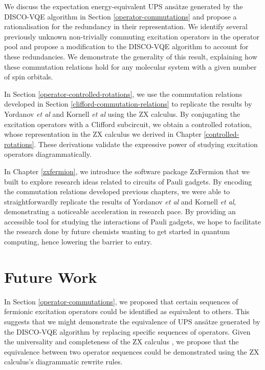 We discuss the expectation energy-equivalent UPS ansätze generated by the DISCO-VQE algorithm in Section \ref{operator-commutations} and propose a rationalisation for the redundancy in their representation. We identify several previously unknown non-trivially commuting excitation operators in the operator pool and propose a modification to the DISCO-VQE algorithm to account for these redundancies. We demonstrate the generality of this result, explaining how these commutation relations hold for any molecular system with a given number of spin orbitals.

In Section \ref{operator-controlled-rotations}, we use the commutation relations developed in Section \ref{clifford-commutation-relations} to replicate the results by Yordanov \textit{et al} and Kornell \textit{et al} using the ZX calculus. By conjugating the excitation operators with a Clifford subcircuit, we obtain a controlled rotation, whose representation in the ZX calculus we derived in Chapter \ref{controlled-rotations}. These derivations validate the expressive power of studying excitation operators diagrammatically.

In Chapter \ref{zxfermion}, we introduce the software package ZxFermion that we built to explore research ideas related to circuits of Pauli gadgets. By encoding the commutation relations developed previous chapters, we were able to straightforwardly replicate the results of Yordanov \textit{et al} and Kornell \textit{et al}, demonstrating a noticeable acceleration in research pace. By providing an accessible tool for studying the interactions of Pauli gadgets, we hope to facilitate the research done by future chemists wanting to get started in quantum computing, hence lowering the barrier to entry.

\section{Future Work}

In Section \ref{operator-commutations}, we proposed that certain sequences of fermionic excitation operators could be identified as equivalent to others. This suggests that we might demonstrate the equivalence of UPS ansätze generated by the DISCO-VQE algorithm by replacing specific sequences of operators. Given the universality and completeness of the ZX calculus \cite{Coecke2011}, we propose that the equivalence between two operator sequences could be demonstrated using the ZX calculus's diagrammatic rewrite rules.


